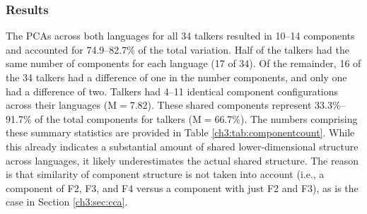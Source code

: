 
\subsubsection{Results}\label{ch3:sec:pca_results} 

The PCAs across both languages for all 34 talkers resulted in 10--14 components and accounted for 74.9--82.7\% of the total variation. Half of the talkers had the same number of components for each language (17 of 34). Of the remainder, 16 of the 34 talkers had a difference of one in the number components, and only one had a difference of two. Talkers had 4--11 identical component configurations across their languages (M$=$7.82). These shared components represent 33.3\%--91.7\% of the total components for talkers (M$=$66.7\%). The numbers comprising these summary statistics are provided in Table \ref{ch3:tab:componentcount}. While this already indicates a substantial amount of shared lower-dimensional structure across languages, it likely underestimates the actual shared structure. The reason is that similarity of component structure is not taken into account (i.e., a component of F2, F3, and F4 versus a component with just F2 and F3), as is the case in Section \ref{ch3:sec:cca}. 

